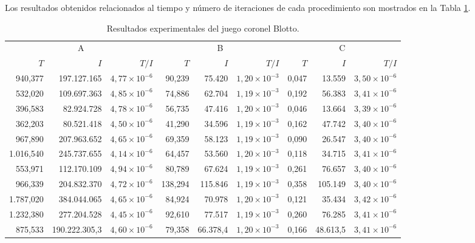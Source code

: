 Los resultados obtenidos relacionados al tiempo y número de iteraciones de cada procedimiento son mostrados en la Tabla \ref{tab:resultados-coronel-blotto}.

\begin{table}[t]
    \centering
    \caption{Resultados experimentales del juego coronel Blotto.}
    \label{tab:resultados-coronel-blotto}
    \scriptsize
    \begin{tabular}{r r r r r r r r r}
    \toprule
    \multicolumn{3}{c}{A} & \multicolumn{3}{c}{B} & \multicolumn{3}{c}{C} \\ \cmidrule(r){1-3} \cmidrule(lr){4-6} \cmidrule(l){7-9}
    $T$ & $I$ & $T/I$ & $T$ & $I$ & $T/I$ & $T$ & $I$ & $T/I$ \\  \cmidrule(r){1-3} \cmidrule(lr){4-6} \cmidrule(l){7-9}
	  940,377 & 197.127.165   & $4,77 {\times} 10^{-6}$ &  90,239 &  75.420   & $1,20 {\times} 10^{-3}$ & 0,047 &  13.559   & $3,50 {\times} 10^{-6}$ \\
	  532,020 & 109.697.363   & $4,85 {\times} 10^{-6}$ &  74,886 &  62.704   & $1,19 {\times} 10^{-3}$ & 0,192 &  56.383   & $3,41 {\times} 10^{-6}$ \\
	  396,583 &  82.924.728   & $4,78 {\times} 10^{-6}$ &  56,735 &  47.416   & $1,20 {\times} 10^{-3}$ & 0,046 &  13.664   & $3,39 {\times} 10^{-6}$ \\
	  362,203 &  80.521.418   & $4,50 {\times} 10^{-6}$ &  41,290 &  34.596   & $1,19 {\times} 10^{-3}$ & 0,162 &  47.742   & $3,40 {\times} 10^{-6}$ \\
	  967,890 & 207.963.652   & $4,65 {\times} 10^{-6}$ &  69,359 &  58.123   & $1,19 {\times} 10^{-3}$ & 0,090 &  26.547   & $3,40 {\times} 10^{-6}$ \\
	1.016,540 & 245.737.655   & $4,14 {\times} 10^{-6}$ &  64,457 &  53.560   & $1,20 {\times} 10^{-3}$ & 0,118 &  34.715   & $3,41 {\times} 10^{-6}$ \\
	  553,971 & 112.170.109   & $4,94 {\times} 10^{-6}$ &  80,789 &  67.624   & $1,19 {\times} 10^{-3}$ & 0,261 &  76.657   & $3,40 {\times} 10^{-6}$ \\
	  966,339 & 204.832.370   & $4,72 {\times} 10^{-6}$ & 138,294 & 115.846   & $1,19 {\times} 10^{-3}$ & 0,358 & 105.149   & $3,40 {\times} 10^{-6}$ \\
	1.787,020 & 384.044.065   & $4,65 {\times} 10^{-6}$ &  84,924 &  70.978   & $1,20 {\times} 10^{-3}$ & 0,121 &  35.434   & $3,42 {\times} 10^{-6}$ \\
	1.232,380 & 277.204.528   & $4,45 {\times} 10^{-6}$ &  92,610 &  77.517   & $1,19 {\times} 10^{-3}$ & 0,260 &  76.285   & $3,41 {\times} 10^{-6}$ \\ \cmidrule(r){1-3} \cmidrule(lr){4-6} \cmidrule(l){7-9}
	  875,533 & 190.222.305,3 & $4,60 {\times} 10^{-6}$ &  79,358 &  66.378,4 & $1,20 {\times} 10^{-3}$ & 0,166 &  48.613,5 & $3,41 {\times} 10^{-6}$ \\ \bottomrule
    \end{tabular}
\end{table}

